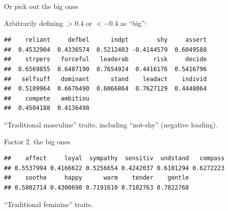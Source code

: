 \begin{frame}[fragile]{Or pick out the big ones}

Arbitrarily defining $>0.4$ or $<-0.4$ as ``big'':



{\small
\begin{knitrout}
\color{fgcolor}\begin{kframe}
\begin{alltt}
\hlkwb{=}\hlopt{$}\hlstd{loadings[,}\hlstd{])}\hlopt{>}
\hlopt{$}\hlstd{loadings[big,}\hlstd{]}
\end{alltt}
\begin{verbatim}
##    reliant     defbel      indpt        shy     assert 
##  0.4532904  0.4336574  0.5212403 -0.4144579  0.6049588 
##    strpers   forceful   leaderab       risk     decide 
##  0.6569855  0.6487190  0.7654924  0.4416176  0.5416796 
##   selfsuff   dominant      stand    leadact    individ 
##  0.5109964  0.6676490  0.6066864  0.7627129  0.4448064 
##    compete   ambitiou 
##  0.4504188  0.4136498
\end{verbatim}
\end{kframe}
\end{knitrout}
}

 ``Traditional masculine'' traits, including
  ``not-shy'' (negative loading).

\end{frame}

\begin{frame}[fragile]{Factor 2, the big ones}
  
{\small  
\begin{knitrout}
\color{fgcolor}\begin{kframe}
\begin{alltt}
\hlkwb{=}\hlopt{$}\hlstd{loadings[,}\hlstd{])}\hlopt{>}
\hlopt{$}\hlstd{loadings[big,}\hlstd{]}
\end{alltt}
\begin{verbatim}
##    affect     loyal  sympathy  sensitiv  undstand   compass 
## 0.5537994 0.4166622 0.5256654 0.4242037 0.6101294 0.6272223 
##    soothe     happy      warm    tender    gentle 
## 0.5802714 0.4300698 0.7191610 0.7102763 0.7022768
\end{verbatim}
\end{kframe}
\end{knitrout}
}

``Traditional feminine'' traits.

\end{frame}

